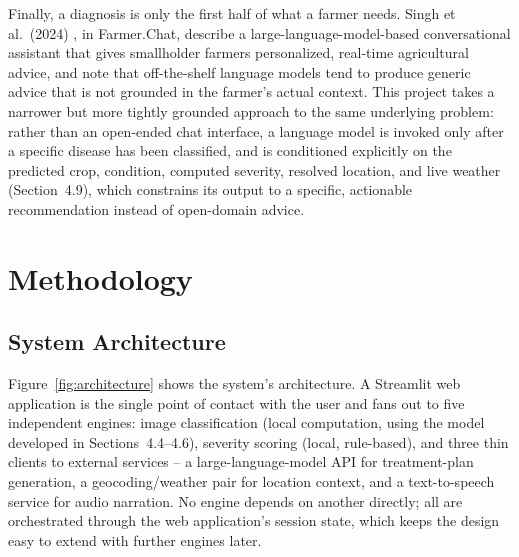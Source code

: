 \documentclass[12pt,a4paper]{article}
\begin{document}
Finally, a diagnosis is only the first half of what a farmer needs. Singh
et al.\ (2024) \cite{singh2024farmerchat}, in Farmer.Chat, describe a
large-language-model-based conversational assistant that gives smallholder
farmers personalized, real-time agricultural advice, and note that
off-the-shelf language models tend to produce generic advice that is not
grounded in the farmer's actual context. This project takes a narrower but
more tightly grounded approach to the same underlying problem: rather than an
open-ended chat interface, a language model is invoked only after a specific
disease has been classified, and is conditioned explicitly on the predicted
crop, condition, computed severity, resolved location, and live weather
(Section~4.9), which constrains its output to a specific, actionable
recommendation instead of open-domain advice.

\section{Methodology}

\subsection{System Architecture}
Figure~\ref{fig:architecture} shows the system's architecture. A Streamlit
web application is the single point of contact with the user and fans out to
five independent engines: image classification (local computation, using the
model developed in Sections~4.4--4.6), severity scoring (local, rule-based),
and three thin clients to external services -- a large-language-model API
for treatment-plan generation, a geocoding/weather pair for location context,
and a text-to-speech service for audio narration. No engine depends on
another directly; all are orchestrated through the web application's session
state, which keeps the design easy to extend with further engines later.
\end{document}

